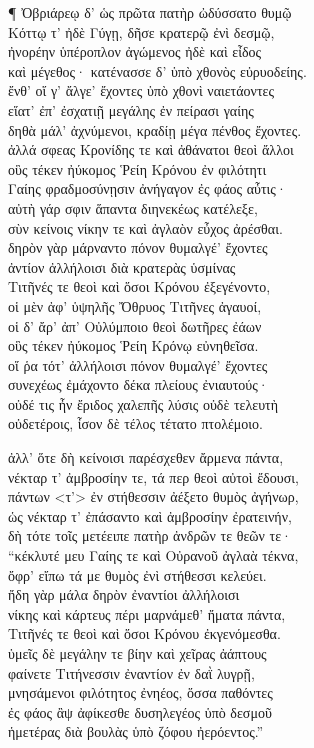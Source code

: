 ¶ Ὀβριάρεῳ δ' ὡς πρῶτα πατὴρ ὠδύσσατο θυμῷ \\
Κόττῳ τ' ἠδὲ Γύγῃ, δῆσε κρατερῷ ἐνὶ δεσμῷ, \\
ἠνορέην ὑπέροπλον ἀγώμενος ἠδὲ καὶ εἶδος\\
καὶ μέγεθος· κατένασσε δ' ὑπὸ χθονὸς εὐρυοδείης.  \\
ἔνθ' οἵ γ' ἄλγε' ἔχοντες ὑπὸ χθονὶ ναιετάοντες\\
εἵατ' ἐπ' ἐσχατιῇ μεγάλης ἐν πείρασι γαίης \\
δηθὰ μάλ' ἀχνύμενοι, κραδίῃ μέγα πένθος ἔχοντες.\\
ἀλλά σφεας Κρονίδης τε καὶ ἀθάνατοι θεοὶ ἄλλοι \\
οὓς τέκεν ἠύκομος Ῥείη Κρόνου ἐν φιλότητι  \\
Γαίης φραδμοσύνῃσιν ἀνήγαγον ἐς φάος αὖτις· \\
αὐτὴ γάρ σφιν ἅπαντα διηνεκέως κατέλεξε, \\
σὺν κείνοις νίκην τε καὶ ἀγλαὸν εὖχος ἀρέσθαι.\\
δηρὸν γὰρ μάρναντο πόνον θυμαλγέ' ἔχοντες\\
ἀντίον ἀλλήλοισι διὰ κρατερὰς ὑσμίνας   \\
Τιτῆνές τε θεοὶ καὶ ὅσοι Κρόνου ἐξεγένοντο, \\
οἱ μὲν ἀφ' ὑψηλῆς Ὄθρυος Τιτῆνες ἀγαυοί,  \\
οἱ δ' ἄρ' ἀπ' Οὐλύμποιο θεοὶ δωτῆρες ἐάων \\
οὓς τέκεν ἠύκομος Ῥείη Κρόνῳ εὐνηθεῖσα.\\
οἵ ῥα τότ' ἀλλήλοισι πόνον θυμαλγέ' ἔχοντες  \\
συνεχέως ἐμάχοντο δέκα πλείους ἐνιαυτούς· \\
οὐδέ τις ἦν ἔριδος χαλεπῆς λύσις οὐδὲ τελευτὴ\\
οὐδετέροις, ἶσον δὲ τέλος τέτατο πτολέμοιο.

\quad{}ἀλλ' ὅτε δὴ κείνοισι παρέσχεθεν ἄρμενα πάντα,\\
νέκταρ τ' ἀμβροσίην τε, τά περ θεοὶ αὐτοὶ ἔδουσι, \\
πάντων \textless{}τ'\textgreater{} ἐν στήθεσσιν ἀέξετο θυμὸς ἀγήνωρ,\\
ὡς νέκταρ τ' ἐπάσαντο καὶ ἀμβροσίην ἐρατεινήν,\\
δὴ τότε τοῖς μετέειπε πατὴρ ἀνδρῶν τε θεῶν τε·\\
``κέκλυτέ μευ Γαίης τε καὶ Οὐρανοῦ ἀγλαὰ τέκνα, \\
ὄφρ' εἴπω τά με θυμὸς ἐνὶ στήθεσσι κελεύει.  \\
ἤδη γὰρ μάλα δηρὸν ἐναντίοι ἀλλήλοισι\\
νίκης καὶ κάρτευς πέρι μαρνάμεθ' ἤματα πάντα, \\
Τιτῆνές τε θεοὶ καὶ ὅσοι Κρόνου ἐκγενόμεσθα.\\
ὑμεῖς δὲ μεγάλην τε βίην καὶ χεῖρας ἀάπτους\\
φαίνετε Τιτήνεσσιν ἐναντίον ἐν δαῒ λυγρῇ, \\
μνησάμενοι φιλότητος ἐνηέος, ὅσσα παθόντες\\
ἐς φάος ἂψ ἀφίκεσθε δυσηλεγέος ὑπὸ δεσμοῦ\\
ἡμετέρας διὰ βουλὰς ὑπὸ ζόφου ἠερόεντος.''

